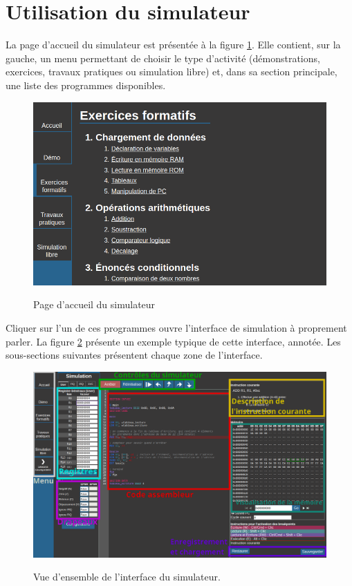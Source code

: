 \documentclass{tufte-handout}
\begin{document}


\tableofcontents

\clearpage
\section{Utilisation du simulateur}

La page d'accueil du simulateur est présentée à la figure \ref{f:accueil}. Elle contient, sur la gauche, un menu permettant de choisir le type d'activité (démonstrations, exercices, travaux pratiques ou simulation libre) et, dans sa section principale, une liste des programmes disponibles.

\begin{figure}
\raggedleft
\includegraphics[width=0.7\linewidth]{pics/accueil.png}
\label{f:accueil}
\caption{Page d'accueil du simulateur}
\end{figure}

Cliquer sur l'un de ces programmes ouvre l'interface de simulation à proprement parler. La figure \ref{f:global} présente un exemple typique de cette interface, annotée. Les sous-sections suivantes présentent chaque zone de l'interface.

\begin{figure}[h!]
\includegraphics[width=0.86\linewidth]{pics/main_labeled.png}
\label{f:global}
\caption{Vue d'ensemble de l'interface du simulateur.}
\end{figure}
\end{document}

